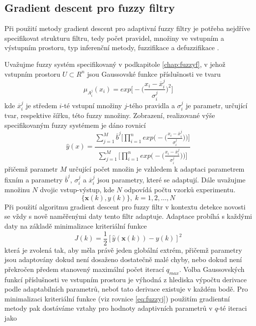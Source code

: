 \subsection{Gradient descent pro fuzzy filtry}\label{chap:gd}
Při použití metody gradient descent pro adaptivní fuzzy filtry je potřeba nejdříve specifikovat strukturu filtru, tedy počet pravidel, množiny ve vstupním a výstupním prostoru, typ inferenční metody, fuzzifikace a defuzzifikace \cite{fuzzywang}.\par Uvažujme fuzzy systém specifikovaný v podkapitole \ref{chap:fuzzyf}, v jehož vstupním prostoru $U\subset R^n$ jsou Gaussovské funkce příslušnosti ve tvaru
\begin{equation}
    \mu_{A^j_i}(x_i)= exp\Bigg[-\Bigg(\frac{x_i-\overline{x}_i^j}{\sigma_i^j}\Bigg)^2\Bigg]
\end{equation}
kde $\overline{x}_i^j$ je středem $i$-té vstupní množiny $j$-tého pravidla a $\sigma_i^j$ je parametr, určující tvar, respektive šířku, této fuzzy množiny. Zobrazení, realizované výše specifikovaným fuzzy systémem je dáno rovnicí
\begin{equation}
    \hat{y}(x)=\frac{\sum_{j=1}^M \overline{b}^j\Big[\prod_{i=1}^n exp\Big(-\Big(\frac{x_i-\overline{x}_i^j}{\sigma_i^j}\Big)\Big)\Big]}{\sum_{j=1}^M \Big[\prod_{i=1}^n exp\Big(-\Big(\frac{x_i-\overline{x}_i^j}{\sigma_i^j}\Big)\Big)\Big]}
\end{equation}
přičemž parametr $M$ určující počet množin je vzhledem k adaptaci parametrem fixním a parametry $\overline{b}^j$, $\sigma_i^j$ a $\overline{x}_i^j$ jsou parametry, které se adaptují. Dále uvažujme množinu $N$ dvojic vstup-výstup, kde $N$ odpovídá počtu vzorků experimentu. 
\begin{equation}
    \{\textbf{x}(k), y(k) \}, \; k=1,2,\dots,N
\end{equation}
Při použití algoritmu gradient descent pro fuzzy filtr v kontextu detekce novosti se vždy s nově naměřenými daty tento filtr adaptuje. Adaptace probíhá s každými daty na základě minimalizace kriteriální funkce
\begin{equation}\label{eq:fuzzyj}
    J(k)=\frac{1}{2}[\hat{y}(\textbf{x}(k))-y(k)]^2
\end{equation}
která je zvolená tak, aby měla právě jeden globální extrém, přičemž parametry jsou adaptovány dokud není dosaženo dostatečně malé chyby, nebo dokud není překročen předem stanovený maximální počet iterací $q_{max}$. Volba Gaussovských funkcí příslušnosti ve vstupním prostoru je výhodná z hlediska výpočtu derivace podle adaptabilních parametrů, neboť tato derivace existuje v každém bodě. Pro minimalizaci kriteriální funkce (viz rovnice \ref{eq:fuzzyj}) použitím gradientní metody pak dostáváme vztahy pro hodnoty adaptivních parametrů v $q$-té iteraci jako

